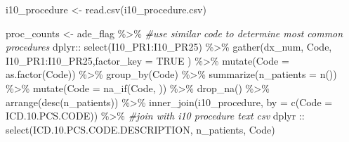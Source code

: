 \documentclass[preprint, 3p,
authoryear]{elsarticle} %
\newenvironment{Shaded}{\begin{snugshade}}{\end{snugshade}}
\newcommand{\AttributeTok}[1]{\textcolor[rgb]{0.77,0.63,0.00}{#1}}
\newcommand{\CommentTok}[1]{\textcolor[rgb]{0.56,0.35,0.01}{\textit{#1}}}
\newcommand{\ConstantTok}[1]{\textcolor[rgb]{0.00,0.00,0.00}{#1}}
\newcommand{\FloatTok}[1]{\textcolor[rgb]{0.00,0.00,0.81}{#1}}
\newcommand{\FunctionTok}[1]{\textcolor[rgb]{0.00,0.00,0.00}{#1}}
\newcommand{\NormalTok}[1]{#1}
\newcommand{\OtherTok}[1]{\textcolor[rgb]{0.56,0.35,0.01}{#1}}
\newcommand{\SpecialCharTok}[1]{\textcolor[rgb]{0.00,0.00,0.00}{#1}}
\newcommand{\StringTok}[1]{\textcolor[rgb]{0.31,0.60,0.02}{#1}}
\begin{document}
\begin{Shaded}
\begin{Highlighting}[]
\NormalTok{i10\_procedure }\OtherTok{\textless{}{-}} \FunctionTok{read.csv}\NormalTok{(}\StringTok{\textquotesingle{}i10\_procedure.csv\textquotesingle{}}\NormalTok{)}


\NormalTok{proc\_counts }\OtherTok{\textless{}{-}}\NormalTok{ ade\_flag }\SpecialCharTok{\%\textgreater{}\%} \CommentTok{\#use similar code to determine most common procedures}
\NormalTok{  dplyr}\SpecialCharTok{::} \FunctionTok{select}\NormalTok{(I10\_PR1}\SpecialCharTok{:}\NormalTok{I10\_PR25) }\SpecialCharTok{\%\textgreater{}\%}
  \FunctionTok{gather}\NormalTok{(dx\_num, Code, I10\_PR1}\SpecialCharTok{:}\NormalTok{I10\_PR25,}\AttributeTok{factor\_key =} \ConstantTok{TRUE}\NormalTok{ ) }\SpecialCharTok{\%\textgreater{}\%}
  \FunctionTok{mutate}\NormalTok{(}\AttributeTok{Code =} \FunctionTok{as.factor}\NormalTok{(Code)) }\SpecialCharTok{\%\textgreater{}\%}
  \FunctionTok{group\_by}\NormalTok{(Code) }\SpecialCharTok{\%\textgreater{}\%}
  \FunctionTok{summarize}\NormalTok{(}\AttributeTok{n\_patients =} \FunctionTok{n}\NormalTok{()) }\SpecialCharTok{\%\textgreater{}\%}
  \FunctionTok{mutate}\NormalTok{(}\AttributeTok{Code =} \FunctionTok{na\_if}\NormalTok{(Code, }\StringTok{\textquotesingle{} \textquotesingle{}}\NormalTok{)) }\SpecialCharTok{\%\textgreater{}\%}
  \FunctionTok{drop\_na}\NormalTok{() }\SpecialCharTok{\%\textgreater{}\%}
  \FunctionTok{arrange}\NormalTok{(}\FunctionTok{desc}\NormalTok{(n\_patients)) }\SpecialCharTok{\%\textgreater{}\%}
  \FunctionTok{inner\_join}\NormalTok{(i10\_procedure, }\AttributeTok{by =} \FunctionTok{c}\NormalTok{(}\StringTok{\textquotesingle{}Code\textquotesingle{}} \OtherTok{=} \StringTok{\textquotesingle{}ICD.10.PCS.CODE\textquotesingle{}}\NormalTok{))  }\SpecialCharTok{\%\textgreater{}\%} \CommentTok{\#join with i10 procedure text csv}
\NormalTok{  dplyr }\SpecialCharTok{::} \FunctionTok{select}\NormalTok{(ICD.}\FloatTok{10.}\NormalTok{PCS.CODE.DESCRIPTION, n\_patients, Code)}



\end{Highlighting}
\end{Shaded}
\end{document}
